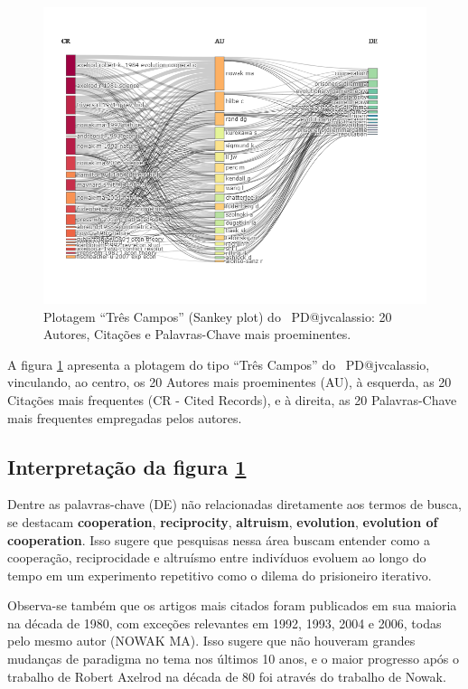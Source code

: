 \begin{figure}
    \centering
    \includegraphics[angle=0,width=1\textwidth]{exploratory-data-analysis/jvcalassio/PesqBibliogr/PrisonersDilemma/WoS-20221201/Dataset/ThreeFieldPlot-2022-12-02.png}
    \caption{Plotagem ``Três Campos'' (Sankey plot) do \dataset\   PD@jvcalassio: 20 Autores, Citações e Palavras-Chave mais proeminentes.}
    \label{fig:PD@jvcalassio:ThreeFieldPlot}
\end{figure}

A figura \ref{fig:PD@jvcalassio:ThreeFieldPlot} apresenta a plotagem do tipo ``Três Campos'' do \dataset\   PD@jvcalassio, vinculando, ao centro, os 20 Autores mais proeminentes (AU), à esquerda, as 20 Citações mais frequentes (CR - Cited Records), e à direita, as 20 Palavras-Chave mais frequentes empregadas pelos autores.

\subsection{Interpretação da figura \ref{fig:PD@jvcalassio:ThreeFieldPlot}}

Dentre as palavras-chave (DE) não relacionadas diretamente aos termos de busca, se destacam \textbf{cooperation}, \textbf{reciprocity}, \textbf{altruism}, \textbf{evolution}, \textbf{evolution of cooperation}. Isso sugere que pesquisas nessa área buscam entender como a cooperação, reciprocidade e altruísmo entre indivíduos evoluem ao longo do tempo em um experimento repetitivo como o dilema do prisioneiro iterativo.

Observa-se também que os artigos mais citados foram publicados em sua maioria na década de 1980, com exceções relevantes em 1992, 1993, 2004 e 2006, todas pelo mesmo autor (NOWAK MA). Isso sugere que não houveram grandes mudanças de paradigma no tema nos últimos 10 anos, e o maior progresso após o trabalho de Robert Axelrod na década de 80 foi através do trabalho de Nowak.

